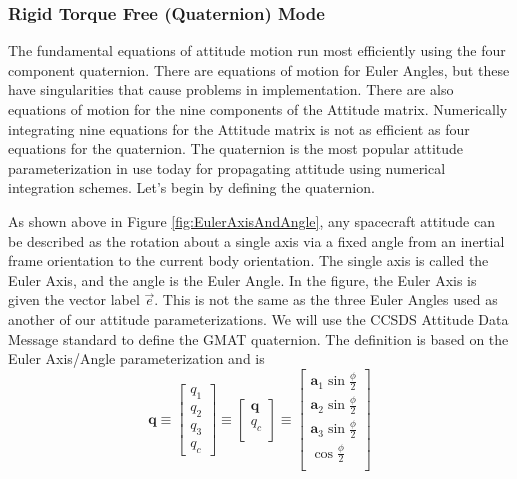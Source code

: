 \subsubsection{Rigid Torque Free (Quaternion) Mode}
The fundamental equations of attitude motion run most efficiently using the four
component quaternion.  There are equations of motion for Euler Angles, but these
have singularities that cause problems in implementation.  There are also
equations of motion for the nine components of the Attitude matrix.  Numerically
integrating nine equations for the Attitude matrix is not as efficient as four
equations for the quaternion.  The quaternion is the most popular attitude
parameterization in use today for propagating attitude using numerical
integration schemes.  Let's begin by defining the quaternion.

As shown above in Figure \ref{fig:EulerAxisAndAngle}, any spacecraft attitude
can be described as the rotation about a single axis via a fixed angle from an
inertial frame orientation to the current body orientation.  The single axis is
called the Euler Axis, and the angle is the Euler Angle.  In the figure, the
Euler Axis is given the vector label $\vec{e}$.  This is not the same as
the three Euler Angles used as another of our attitude parameterizations.  We
will use the CCSDS Attitude Data Message standard to define the GMAT quaternion.
The definition is based on the Euler Axis/Angle parameterization and is
%
\begin{equation}
	\boldsymbol q \equiv
        \begin{bmatrix}
            q_1 \\
            q_2 \\
            q_3 \\
            q_c
        \end{bmatrix}
        \equiv %
        \begin{bmatrix}
            \mathbf{q} \\
            q_c \\
        \end{bmatrix}
        \equiv %
        \begin{bmatrix}
            \mathbf{a}_1 \sin \frac{\phi}{2} \\
            \mathbf{a}_2 \sin \frac{\phi}{2} \\
            \mathbf{a}_3 \sin \frac{\phi}{2} \\
            \cos \frac{\phi}{2} \\
        \end{bmatrix}
    \label{Eq:QuaternionDefinition}
\end{equation}
